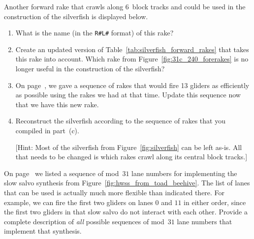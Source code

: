 \begin{multicols}{2}
	
	
	\mfilbreak
	
	
	\begin{problem}\label{exer:self_support_spaceships_r3l28}
		Another forward rake that crawls along $6$~block tracks and could be used in the construction of the silverfish is displayed below.
		\begin{center}
		\end{center}
		
		\begin{enumerate}[label=\bf\color{ocre}(\alph*)]
			\item {} What is the name (in the \texttt{R\#L\#} format) of this rake?
			
			\item {} Create an updated version of Table~\ref{tab:silverfish_forward_rakes} that takes this rake into account. Which rake from Figure~\ref{fig:31c_240_forerakes} is no longer useful in the construction of the silverfish?
			
			\item {} On page~\pageref{page:silverfish_rake_seq}, we gave a sequence of rakes that would fire 13 gliders as efficiently as possible using the rakes we had at that time. Update this sequence now that we have this new rake.
			
			\item {} Reconstruct the silverfish according to the sequence of rakes that you compiled in part~(c).
			
			[Hint: Most of the silverfish from Figure~\ref{fig:silverfish} can be left as-is. All that needs to be changed is which rakes crawl along its central block tracks.]
		\end{enumerate}
	\end{problem}
	
	
	\mfilbreak
	
	
	\begin{problemstar}\label{exer:silverfish_list_of_lanes} 
		On page~\pageref{page:silverfish_lanes} we listed a sequence of mod~$31$ lane numbers for implementing the slow salvo synthesis from Figure~\ref{fig:hwss_from_toad_beehive}. The list of lanes that can be used is actually much more flexible than indicated there. For example, we can fire the first two gliders on lanes $0$ and $11$ in either order, since the first two gliders in that slow salvo do not interact with each other. Provide a complete description of \emph{all} possible sequences of mod~$31$ lane numbers that implement that synthesis.
	\end{problemstar}
	

\end{multicols}
